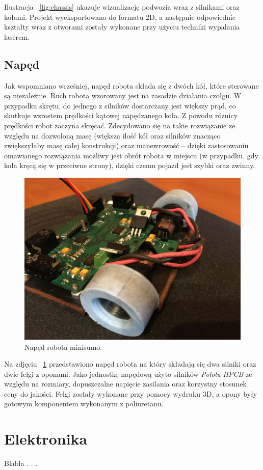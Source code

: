 Ilustracja ~\ref{fig:chassis} ukazuje wizualizację podwozia wraz z silnikami oraz kołami. Projekt wyeksportowano do formatu 2D, a następnie odpowiednie kształty wraz z otworami zostały wykonane przy użyciu techniki wypalania laserem. 

\subsection{Napęd}
Jak wspomniano wcześniej, napęd robota składa się z dwóch kół, które sterowane są niezależnie. Ruch robota wzorowany jest na zasadzie działania czołgu. W przypadku skrętu, do jednego z silników dostarczany jest większy prąd, co skutkuje wzrostem prędkości kątowej napędzanego koła. Z powodu różnicy prędkości robot zaczyna skręcać. Zdecydowano się na takie rozwiązanie ze względu na dozwoloną masę (większa ilość kół oraz silników znacząco zwiększyłaby masę całej konstrukcji) oraz manewrowość – dzięki zastosowaniu omawianego rozwiązania możliwy jest obrót robota w miejscu (w przypadku, gdy koła kręcą się w przeciwne strony), dzięki czemu pojazd jest szybki oraz zwinny. 

\begin{figure}[H]
	\centering
		\includegraphics[width=0.75\linewidth]{pic04/drive.JPG}
	\caption{Napęd robota minisumo.}
	\label{fig:drive}	
\end{figure}

Na zdjęciu ~\ref{fig:drive} przedstawiono napęd robota na który składają się dwa silniki oraz dwie felgi z oponami. Jako jednostkę napędową użyto silników \textit{Pololu HPCB} ze względu  na rozmiary, dopuszczalne napięcie zasilania oraz korzystny stosunek ceny do jakości. Felgi zostały wykonane przy pomocy wydruku 3D, a opony były gotowym komponentem wykonanym z poliuretanu.
\section{Elektronika}
Blabla . . .
